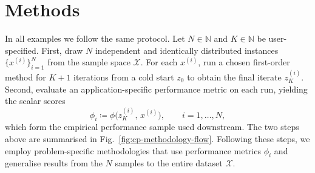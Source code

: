 \section{Methods}
\label{sec:common_methodology}
In all examples we follow the same protocol. Let $N\in\mathbb{N}$ and $K\in\mathbb{N}$ be user-specified. First, draw $N$ independent and identically distributed instances $\{x^{(i)}\}_{i=1}^{N}$ from the sample space $\mathcal{X}$. For each $x^{(i)}$, run a chosen first-order method for $K{+}1$ iterations from a cold start $z_0$ to obtain the final iterate $z_K^{(i)}$. Second, evaluate an application-specific performance metric on each run, yielding the scalar scores
\[
\phi_i \coloneqq \phi\bigl(z_K^{(i)},\, x^{(i)}\bigr), \qquad i=1,\dots,N,
\]
which form the empirical performance sample used downstream. The two steps above are summarised in Fig.~\ref{fig:cp-methodology-flow}. Following these steps, we employ problem-specific methodologies that use performance metrics $\phi_i$ and generalise results from the $N$ samples to the entire dataset $\mathcal{X}$.

